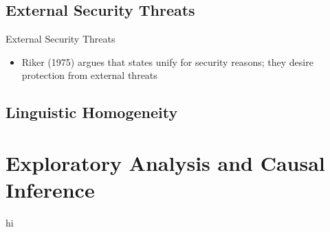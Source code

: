 \documentclass{beamer}
\begin{document}
	\subsection{External Security Threats}
	\begin{frame}{External Security Threats}
		\begin{itemize}
			\item Riker (1975) argues that states unify for security reasons; they desire protection from external threats
		\end{itemize}
	\end{frame}
	\subsection{Linguistic Homogeneity}
	\section{Exploratory Analysis and Causal Inference}
	\begin{frame}{}
		hi
	\end{frame}
\end{document}
